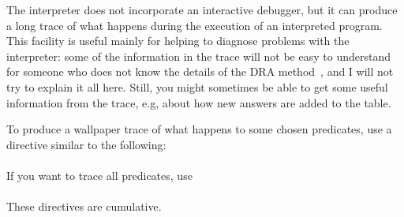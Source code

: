 The interpreter does not incorporate an interactive debugger, but it can
produce a long trace of what happens during the execution of an interpreted
program.  This facility is useful mainly for helping to diagnose problems
with the interpreter: some of the information in the trace will not be easy
to understand for someone who does not know the details of the DRA
method~\cite{guo-gupta-dra}, and I will not try to explain it all here.
Still, you might sometimes be able to get some useful information from the
trace, e.g, about how new answers are added to the table.

To produce a wallpaper trace of what happens to some chosen predicates, use a
directive similar to the following:\\
\ind{}\label{dir:trace}\\
If you want to trace all predicates, use\\
\ind{}\\
These directives are cumulative.


